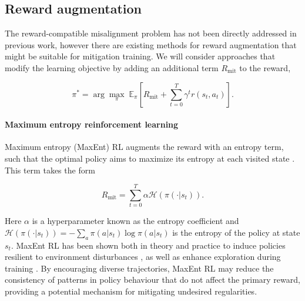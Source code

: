 \subsection{Reward augmentation}

The reward-compatible misalignment problem has not been directly addressed in previous work, however there are existing methods for reward augmentation that might be suitable for mitigation training. We will consider approaches that modify the learning objective by adding an additional term $R_{\mathrm{mit}}$ to the reward, 

\begin{equation}
    \pi^* = \arg \underset{\pi}{\max}\;\mathbb{E}_\pi\left[  R_{\mathrm{mit}}+\sum^T_{t=0}\gamma^t r(s_t, a_t)\right].
\end{equation}

\paragraph{Maximum entropy reinforcement learning}

Maximum entropy (MaxEnt) RL augments the reward with an entropy term, such that the optimal policy aims to maximize its entropy at each visited state \citep{haarnoja_energybased_policies_2017}. This term takes the form

\begin{equation}
     R_{\mathrm{mit}} = \sum^T_{t=0}\alpha\mathcal{H}(\pi(\cdot|s_t)).
\end{equation}

Here $\alpha$ is a hyperparameter known as the entropy coefficient and $\mathcal{H}(\pi(\cdot|s_t)) = -\sum_a\pi(a|s_t)\log\pi(a|s_t)$ is the entropy of the policy at state $s_t$. MaxEnt RL has been shown both in theory and practice to induce policies resilient to environment disturbances \cite{eysenbach_diversity_2018}, as well as enhance exploration during training \citep{cui_entropy_2025}. By encouraging diverse trajectories, MaxEnt RL may reduce the consistency of patterns in policy behaviour that do not affect the primary reward, providing a potential mechanism for mitigating undesired regularities.


